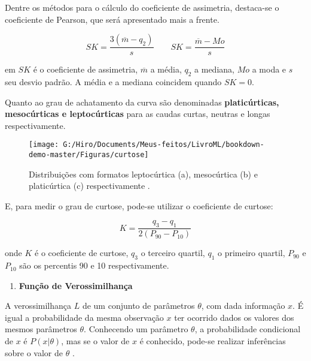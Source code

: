 \documentclass[
  openany]{book}
\providecommand{\tightlist}{%
  \setlength{\itemsep}{0pt}\setlength{\parskip}{0pt}}
\begin{document}
Dentre os métodos para o cálculo do coeficiente de assimetria, destaca-se o coeficiente de Pearson, que será apresentado mais a frente.

\begin{equation}
    SK=\frac{3(\overline{m}-q_2)}{s} \quad \quad SK=\frac{\overline{m}-Mo}{s}
     \label{eq:coefassimetria}
\end{equation}

em \(SK\) é o coeficiente de assimetria, \(\overline{m}\) a média, \(q_2\) a mediana, \(Mo\) a moda e \(s\) seu desvio padrão. A média e a mediana coincidem quando \(SK=0\).

Quanto ao grau de achatamento da curva são denominadas \textbf{platicúrticas, mesocúrticas e leptocúrticas} para as caudas curtas, neutras e longas respectivamente.

\begin{figure}

{\centering \texttt{[image: G:/Hiro/Documents/Meus-feitos/LivroML/bookdown-demo-master/Figuras/curtose]} 

}

\caption{Distribuições com formatos leptocúrtica (a), mesocúrtica (b) e platicúrtica (c) respectivamente \citep{freund2009estatistica}.}\label{fig:curtose}
\end{figure}



E, para medir o grau de curtose, pode-se utilizar o coeficiente de curtose:

\begin{equation}
    K=\frac{q_3-q_1}{2(P_{90}-P_{10})}
    \label{eq:curtose}
\end{equation}

onde \(K\) é o coeficiente de curtose, \(q_3\) o terceiro quartil, \(q_1\) o primeiro quartil, \(P_{90}\) e \(P_{10}\) são os percentis 90 e 10 respectivamente.

\begin{enumerate}
\def\labelenumi{\arabic{enumi}.}
\setcounter{enumi}{9}
\tightlist
\item
  \textbf{Função de Verossimilhança}
\end{enumerate}

A verossimilhança \(L\) de um conjunto de parâmetros \(\theta\), com dada informação \(x\). É igual a probabilidade da mesma observação \(x\) ter ocorrido dados os valores dos mesmos parâmetros \(\theta\). Conhecendo um parâmetro \(\theta\), a probabilidade condicional de \(x\) é \(P(x|\theta)\), mas se o valor de \(x\) é conhecido, pode-se realizar inferências sobre o valor de \(\theta\) \citep{bolfarine2001introduccao}.
\end{document}
